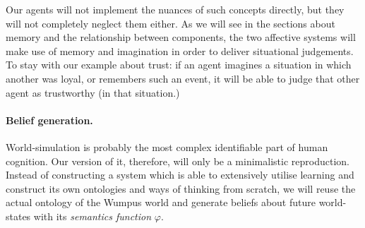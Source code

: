 Our agents will not implement the nuances of such concepts directly, but they will not completely neglect them either. As we will see in the sections about memory and the relationship between components, the two affective systems will make use of memory and imagination in order to deliver situational judgements. To stay with our example about trust: if an agent imagines a situation in which another was loyal, or remembers such an event, it will be able to judge that other agent as trustworthy (in that situation.)

\paragraph{Belief generation.} World-simulation is probably the most complex identifiable part of human cognition. Our version of it, therefore, will only be a minimalistic reproduction. Instead of constructing a system which is able to extensively utilise learning and construct its own ontologies and ways of thinking from scratch, we will reuse the actual ontology of the Wumpus world and generate beliefs about future world-states with its \emph{semantics function} $\varphi$.


